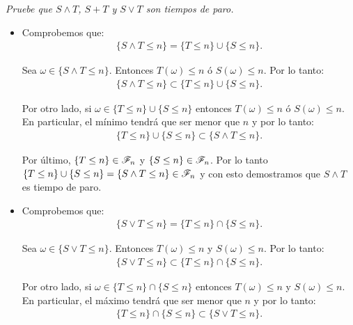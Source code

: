 \emph{
	Pruebe que ${ S \wedge T }$, ${ S + T }$ y ${ S \vee T}$ son tiempos de paro.\\
}

	\begin{itemize}
		\item 
			Comprobemos que:
			\begin{align}
				\{ S \wedge T \leq n \} = \{ T \leq n \} \cup \{ S \leq n\}.
			\end{align}
			
			Sea ${\omega \in \{ S \wedge T \leq n \}}$. Entonces ${T(\omega) \leq n}$ ó ${S(\omega) \leq n}$.
			Por lo tanto:
			\begin{align}
					\{ S \wedge T \leq n \} \subset \{ T \leq n \} \cup \{ S \leq n\}.							
			\end{align}
			
			Por otro lado, si ${\omega \in \{ T \leq n \} \cup \{ S \leq n\}}$ entonces ${T(\omega) \leq n}$ ó ${S(\omega) \leq n}$.
			En particular, el mínimo tendrá que ser menor que ${n}$ y por lo tanto:
			\begin{align}
					\{ T \leq n \} \cup \{ S \leq n\} \subset \{ S \wedge T \leq n \}.						
			\end{align}
			
			Por último, ${\{ T \leq n \} \in \mathscr{F}_n}$ y ${\{ S \leq n \} \in \mathscr{F}_n}$. Por lo tanto	\\	
			${\{ T \leq n \} \cup \{ S \leq n\} = \{ S \wedge T \leq n \} \in \mathscr{F}_n}$ y con esto demostramos que 
			${ S \wedge T}$ es tiempo de paro.\\
			
		\item
			Comprobemos que:
			\begin{align}
				\{ S \vee T \leq n \} = \{ T \leq n \} \cap \{ S \leq n\}.
			\end{align}
			
			Sea ${\omega \in \{ S \vee T \leq n \}}$. Entonces ${T(\omega) \leq n}$ y ${S(\omega) \leq n}$.
			Por lo tanto:
			\begin{align}
					\{ S \vee T \leq n \} \subset \{ T \leq n \} \cap \{ S \leq n\}.							
			\end{align}
			
			Por otro lado, si ${\omega \in \{ T \leq n \} \cap \{ S \leq n\}}$ entonces ${T(\omega) \leq n}$ y ${S(\omega) \leq n}$.
			En particular, el máximo tendrá que ser menor que ${n}$ y por lo tanto:
			\begin{align}
					\{ T \leq n \} \cap \{ S \leq n\} \subset \{ S \vee T \leq n \}.						
			\end{align}
			

\end{itemize}
